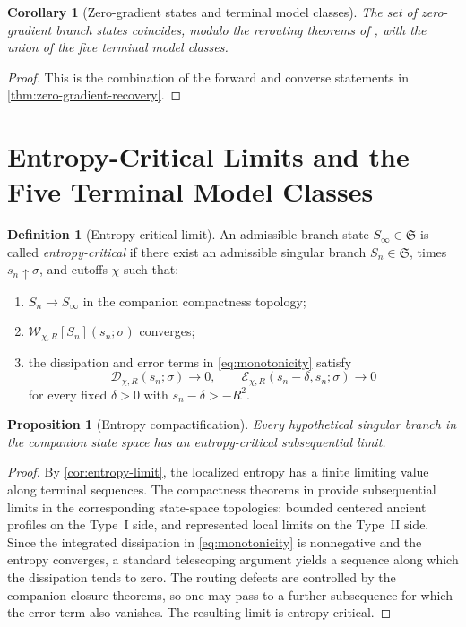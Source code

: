 \documentclass[11pt]{amsart}
\numberwithin{equation}{section}
\theoremstyle{plain}
\newtheorem{proposition}[theorem]{Proposition}
\newtheorem{corollary}[theorem]{Corollary}
\theoremstyle{definition}
\newtheorem{definition}[theorem]{Definition}
\theoremstyle{remark}
\newcommand{\Wloc}{\mathcal W}
\newcommand{\Diss}{\mathcal D}
\newcommand{\Err}{\mathcal E}
\newcommand{\State}{\mathfrak S}
\begin{document}
\begin{corollary}[Zero-gradient states and terminal model classes]
\label{cor:gradient-classes}
The set of zero-gradient branch states coincides, modulo the rerouting theorems
of \cite{BallesterSetup,BallesterResidual,BallesterTypeII}, with the union of
the five terminal model classes.
\end{corollary}

\begin{proof}
This is the combination of the forward and converse statements in
\cref{thm:zero-gradient-recovery}.
\end{proof}

\section{Entropy-Critical Limits and the Five Terminal Model Classes}
\label{sec:critical}

\begin{definition}[Entropy-critical limit]
\label{def:entropy-critical}
An admissible branch state \(S_\infty\in\State\) is called
\emph{entropy-critical} if there exist an admissible singular branch
\(S_n\in\State\), times \(s_n\uparrow\sigma\), and cutoffs \(\chi\) such that:
\begin{enumerate}[label=\textup{(\roman*)},leftmargin=2.2em]
	\item \(S_n\to S_\infty\) in the companion compactness topology;
	\item \(\Wloc_{\chi,R}[S_n](s_n;\sigma)\) converges;
	\item the dissipation and error terms in \eqref{eq:monotonicity} satisfy
	\[
		\Diss_{\chi,R}(s_n;\sigma)\to0,
		\qquad
		\Err_{\chi,R}(s_n-\delta,s_n;\sigma)\to0
	\]
	for every fixed \(\delta>0\) with \(s_n-\delta>-R^2\).
\end{enumerate}
\end{definition}

\begin{proposition}[Entropy compactification]
\label{prop:entropy-compactification}
Every hypothetical singular branch in the companion state space has an
entropy-critical subsequential limit.
\end{proposition}

\begin{proof}
By \cref{cor:entropy-limit}, the localized entropy has a finite limiting value
along terminal sequences.  The compactness theorems in
\cite{BallesterSetup,BallesterResidual,BallesterTypeII} provide subsequential
limits in the corresponding state-space topologies: bounded centered ancient
profiles on the Type~I side, and represented local limits on the Type~II side.
Since the integrated dissipation in \eqref{eq:monotonicity} is nonnegative and
the entropy converges, a standard telescoping argument yields a sequence along
which the dissipation tends to zero.  The routing defects are controlled by the
companion closure theorems, so one may pass to a further subsequence for which
the error term also vanishes.  The resulting limit is entropy-critical.
\end{proof}
\end{document}
